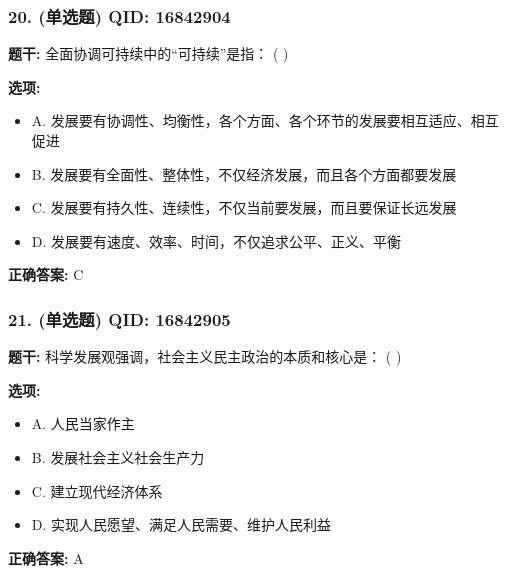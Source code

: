 \documentclass[12pt,UTF8]{ctexart}
\begin{document}
\vspace{0.3em}\hrulefill\vspace{0.7em}

\subsubsection*{20. (单选题) \small QID: 16842904}

\textbf{题干:}
全面协调可持续中的“可持续”是指： ( )

\textbf{选项:}
\begin{itemize}[leftmargin=*]

  \item A. 发展要有协调性、均衡性，各个方面、各个环节的发展要相互适应、相互促进

  \item B. 发展要有全面性、整体性，不仅经济发展，而且各个方面都要发展

  \item C. 发展要有持久性、连续性，不仅当前要发展，而且要保证长远发展

  \item D. 发展要有速度、效率、时间，不仅追求公平、正义、平衡

\end{itemize}

\textbf{正确答案:}
C

\vspace{0.3em}\hrulefill\vspace{0.7em}

\subsubsection*{21. (单选题) \small QID: 16842905}

\textbf{题干:}
科学发展观强调，社会主义民主政治的本质和核心是： ( )

\textbf{选项:}
\begin{itemize}[leftmargin=*]

  \item A. 人民当家作主

  \item B. 发展社会主义社会生产力

  \item C. 建立现代经济体系

  \item D. 实现人民愿望、满足人民需要、维护人民利益

\end{itemize}

\textbf{正确答案:}
A
\end{document}
